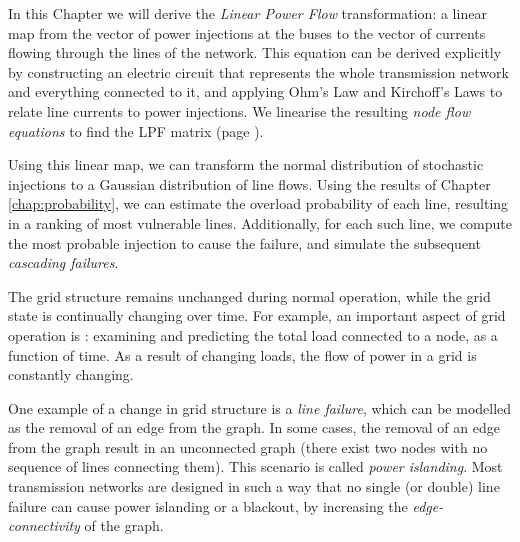 \documentclass[main.tex]{subfiles}
\begin{document}
In this Chapter we will derive the \emph{Linear Power Flow} transformation: a linear map from the vector of power injections at the buses to the vector of currents flowing through the lines of the network. 
This equation can be derived explicitly by constructing an electric circuit that represents the whole transmission network and everything connected to it, and applying Ohm's Law and Kirchoff's Laws to relate line currents to power injections. We linearise the resulting \emph{node flow equations} to find the LPF matrix (page \pageref{eq:LPF}).

Using this linear map, we can transform the normal distribution of stochastic injections to a Gaussian distribution of line flows. Using the results of Chapter \ref{chap:probability}, we can estimate the overload probability of each line, resulting in a ranking of most vulnerable lines. Additionally, for each such line, we compute the most probable injection to cause the failure, and simulate the subsequent \emph{cascading failures}.



The grid structure remains unchanged during normal operation, while the grid state is continually changing over time. For example, an important aspect of grid operation is : examining and predicting the total load connected to a node, as a function of time. As a result of changing loads, the flow of power in a grid is constantly changing.

One example of a change in grid structure is a \emph{line failure}, which can be modelled as the removal of an edge from the graph. In some cases, the removal of an edge from the graph result in an unconnected graph (\ie there exist two nodes with no sequence of lines connecting them). This scenario is called \emph{power islanding}.
Most transmission networks are designed in such a way that no single (or double) line failure can cause power islanding or a blackout, by increasing the \emph{edge-connectivity} of the graph.
\end{document}
